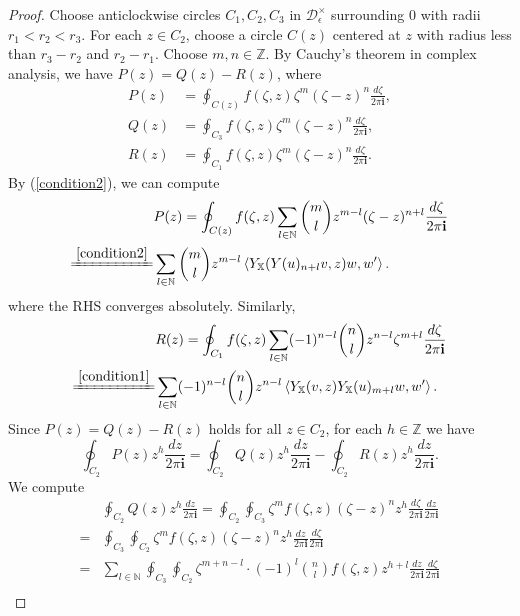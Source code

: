 \documentclass[11pt,b5paper,notitlepage]{article}
\theoremstyle{definition}
\theoremstyle{plain}
\newcommand{\im}{\mathbf{i}}
\newcommand{\Xbb}{\mathbb X}
\newcommand{\Nbb}{\mathbb N}
\newcommand{\Zbb}{\mathbb Z}
\newcommand{\<}{\left\langle}
\renewcommand{\>}{\right\rangle}
\newcommand{\MD}{\mathcal{D}}
\numberwithin{equation}{subsection}
\begin{document}
\begin{proof}
Choose anticlockwise circles $C_1,C_2,C_3$ in $\MD_\epsilon^\times $ surrounding $0$ with radii $r_1<r_2<r_3$. For each $z\in C_2$, choose a circle $C(z)$ centered at $z$ with radius less than $r_3-r_2$ and $r_2-r_1$. Choose $m,n\in \Zbb$. By Cauchy's theorem in complex analysis, we have $P(z)=Q(z)-R(z)$, where
    $$
    \begin{aligned}
        P(z)&=\oint_{C(z)}f(\zeta,z)\zeta^m (\zeta-z)^n \frac{d\zeta}{2\pi\im},\\
        Q(z)&=\oint_{C_3}f(\zeta,z)\zeta^m (\zeta-z)^n \frac{d\zeta}{2\pi\im},\\
        R(z)&=\oint_{C_1}f(\zeta,z)\zeta^m (\zeta-z)^n \frac{d\zeta}{2\pi\im}.
    \end{aligned}
    $$
    By (\ref{condition2}), we can compute
\begin{align}
        & P(z)=\oint_{C(z)}f(\zeta,z)\sum_{l\in \Nbb}\binom{m}{l}z^{m-l}(\zeta-z)^{n+l}\frac{d\zeta}{2\pi\im}  \nonumber\\
\xlongequal{\eqref{condition2}}&\sum_{l\in \Nbb}\binom{m}{l}z^{m-l} \<Y_\Xbb(Y(u)_{n+l}v,z)w,w'\>.  \label{eq74}
\end{align}
where the RHS converges absolutely. Similarly,
\begin{align}
&R(z)=\oint_{C_1}f(\zeta,z)\sum_{l\in \Nbb}(-1)^{n-l}\binom{n}{l}z^{n-l}\zeta^{m+l} \frac{d\zeta}{2\pi\im}  \nonumber\\
\xlongequal{\eqref{condition1}}&\sum_{l\in \Nbb}(-1)^{n-l}\binom{n}{l}z^{n-l}\<Y_\Xbb(v,z)Y_\Xbb(u)_{m+l}w,w'\>. \label{eq75}
\end{align}
    Since $P(z)=Q(z)-R(z)$ holds for all $z\in C_2$, for each $h\in \Zbb$ we have 
    \begin{equation}\label{criterion1}
    \oint_{C_2}P(z)z^h\frac{dz}{2\pi\im}=\oint_{C_2}Q(z)z^h\frac{dz}{2\pi\im}-\oint_{C_2}R(z)z^h\frac{dz}{2\pi\im}.
    \end{equation}
We compute
\begin{align}
        &\oint_{C_2}Q(z)z^h\frac{dz}{2\pi\im}=\oint_{C_2} \oint_{C_3}\zeta^mf(\zeta,z)(\zeta-z)^n z^h \frac{d\zeta}{2\pi\im}\frac{dz}{2\pi\im} \nonumber\\
=&\oint_{C_3}\oint_{C_2}\zeta^m f(\zeta,z)(\zeta-z)^n z^h \frac{dz}{2\pi\im}\frac{d\zeta}{2\pi\im} \nonumber\\
        =&\sum_{l\in \Nbb}\oint_{C_3}\oint_{C_2}\zeta^{m+n-l}\cdot(-1)^l \binom{n}{l}f(\zeta,z) z^{h+l}\frac{dz}{2\pi\im}\frac{d\zeta}{2\pi\im} \nonumber\\

\end{align}
\end{proof}
\end{document}
